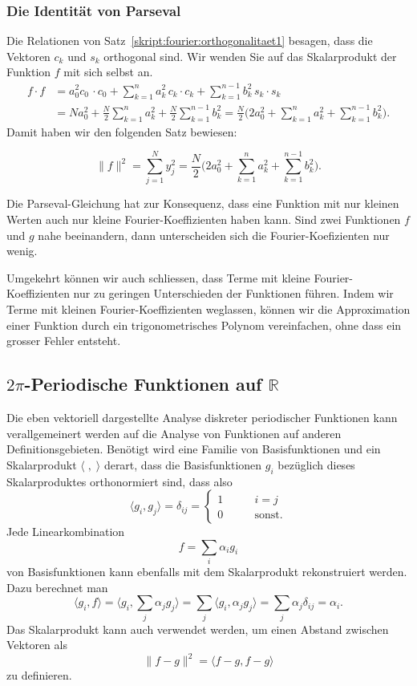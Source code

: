 \subsubsection{Die Identität von Parseval}
Die Relationen von
Satz~\ref{skript:fourier:orthogonalitaet1}
besagen, dass die Vektoren $c_k$ und $s_k$ orthogonal sind.
Wir wenden Sie auf das Skalarprodukt der Funktion $f$ mit sich selbst an.
\begin{align*}
f\cdot f
&=
a_0^2 c_0\,\cdot c_0
+
\sum_{k=1}^na_k^2 \,c_k\cdot c_k
+
\sum_{k=1}^{n-1} b_k^2\,s_k\cdot s_k
\\
&=
Na_0^2
+
\frac{N}2\sum_{k=1}^n a_k^2
+
\frac{N}2\sum_{k=1}^{n-1} b_k^2
=
\frac{N}2
\biggl(
2a_0^2
+
\sum_{k=1}^n a_k^2
+
\sum_{k=1}^{n-1} b_k^2
\biggr).
\end{align*}
Damit haben wir den folgenden Satz bewiesen:
\begin{satz}[Parseval]
\[
\|f\|^2
=
\sum_{j=1}^N y_j^2
=
\frac{N}2
\biggl(
2a_0^2
+
\sum_{k=1}^n a_k^2
+
\sum_{k=1}^{n-1} b_k^2
\biggr).
\]
\end{satz}
%
Die Parseval-Gleichung hat zur Konsequenz, dass eine Funktion mit nur
kleinen Werten auch nur kleine Fourier-Koeffizienten haben kann.
Sind zwei Funktionen $f$ und $g$ nahe beeinandern, dann unterscheiden
sich die Fourier-Koefizienten nur wenig.

Umgekehrt können wir auch schliessen, dass Terme mit kleine
Fourier-Koeffizienten nur zu geringen Unterschieden der Funktionen
führen.
Indem wir Terme mit kleinen Fourier-Koeffizienten weglassen, 
können wir die Approximation einer Funktion durch ein trigonometrisches
Polynom vereinfachen, ohne dass ein grosser Fehler entsteht.

\subsection{$2\pi$-Periodische Funktionen auf $\mathbb R$\label{subsection:fourier:stetig}}
Die eben vektoriell dargestellte Analyse diskreter periodischer Funktionen 
kann verallgemeinert werden auf die Analyse von Funktionen auf
anderen Definitionsgebieten.
Benötigt wird eine Familie von Basisfunktionen und ein Skalarprodukt
$\langle\;,\;\rangle$ derart, dass die Basisfunktionen $g_i$ bezüglich
dieses Skalarproduktes orthonormiert sind, dass also
\[
\langle g_i,g_j\rangle
=
\delta_{ij}
=
\begin{cases}
1&\qquad i=j\\
0&\qquad\text{sonst}.
\end{cases}
\]
Jede Linearkombination
\[
f = \sum_{i} \alpha_i g_i
\]
von Basisfunktionen kann ebenfalls mit dem Skalarprodukt rekonstruiert
werden.
Dazu berechnet man
\[
\langle g_i,f\rangle
=
\biggl\langle
g_i,\sum_j\alpha_jg_j
\biggr\rangle
=
\sum_j \langle g_i,\alpha_jg_j\rangle
=
\sum_j \alpha_j\delta_{ij}
=
\alpha_i.
\]
Das Skalarprodukt kann auch verwendet werden, um einen Abstand zwischen
Vektoren als
\[
\| f-g\|^2
=
\langle f-g,f-g\rangle
\]
zu definieren.

